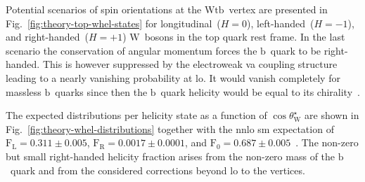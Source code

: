 Potential scenarios of spin orientations at the $\mathrm{Wtb}$~vertex are presented in Fig.~\ref{fig:theory-top-whel-states} for longitudinal~($H=0$), left-handed~($H=-1$), and right-handed~($H=+1$) $\mathrm{W}$~bosons in the top quark rest frame. In the last scenario the conservation of angular momentum forces the $\mathrm{b}$~quark to be right-handed. This is however suppressed by the electroweak \gls{va} coupling structure leading to a nearly vanishing probability at \gls{lo}. It would vanish completely for massless $\mathrm{b}$~quarks since then the $\mathrm{b}$~quark helicity would be equal to its chirality~\cite{Bernreuther:2008ju}.


The expected distributions per helicity state as a function of $\cos\theta^\star_\mathrm{W}$ are shown in Fig.~\ref{fig:theory-whel-distributions} together with the \gls{nnlo} \gls{sm} expectation of $\mathrm{F}_\mathrm{L}=0.311\pm0.005$, $\mathrm{F}_\mathrm{R}=0.0017\pm0.0001$, and $\mathrm{F}_{0}=0.687\pm0.005$~\cite{Czarnecki:2010gb}. The non-zero but small right-handed helicity fraction arises from the non-zero mass of the $\mathrm{b}$~quark and from the considered corrections beyond \gls{lo} to the vertices.
 

